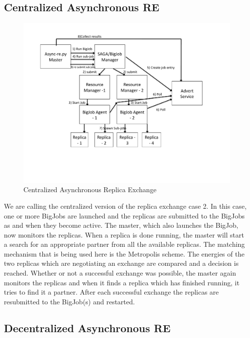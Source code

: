 \documentclass[a4paper,10pt]{article}
\begin{document}
\subsection{Centralized Asynchronous RE}

\begin{figure}
\centering
\includegraphics[scale=0.50]{figures/centralized_architecture}
\caption{\small Centralized Asynchronous Replica Exchange}
\label{fig:centralized}
\end{figure}

We are calling the centralized version of the replica exchange case 2. In this case, one or more BigJobs are
launched and the replicas are submitted to the BigJobs as and when they become active. The master, which also launches the BigJob,
now monitors the replicas. When a replica is done running, the master will start a search for an appropriate partner from all the available replicas. The matching mechanism
that is being used here is the Metropolis scheme. The energies of the two replicas which are negotiating an exchange are compared and a decision is reached.
Whether or not a successful exchange was possible, the master again monitors the replicas and when it finds a replica which has finished running, it tries to find it a partner.
After each successful exchange the replicas are resubmitted to the BigJob(s) and restarted.

\subsection{Decentralized Asynchronous RE}
\end{document}
